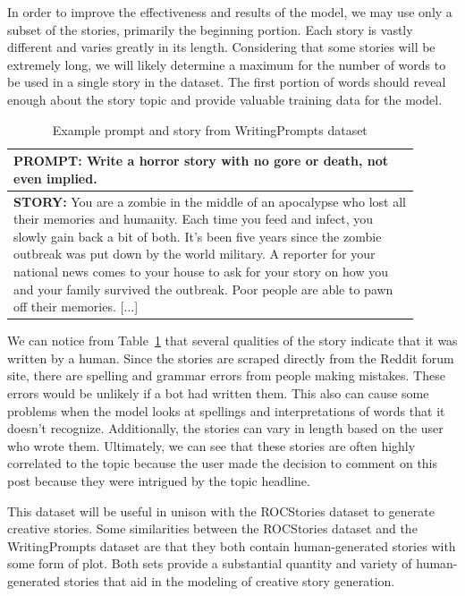 \documentclass{article} %
\begin{document}
In order to improve the effectiveness and results of the model, we may use only a subset of the stories, primarily the beginning portion. Each story is vastly different and varies greatly in its length. Considering that some stories will be extremely long, we will likely determine a maximum for the number of words to be used in a single story in the dataset. The first portion of words should reveal enough about the story topic and provide valuable training data for the model. 

\begin{table}[htbp]
\centering
\caption{Example prompt and story from WritingPrompts dataset}
\begin{tabular}{p{0.9\linewidth}}
\hline
\noindent \textbf{PROMPT:} Write a horror story with no gore or death, not even implied. \\
\hline
\noindent \textbf{STORY:} You are a zombie in the middle of an apocalypse who lost all their memories and humanity. Each time you feed and infect, you slowly gain back a bit of both. It's been five years since the zombie outbreak was put down by the world military. A reporter for your national news comes to your house to ask for your story on how you and your family survived the outbreak. Poor people are able to pawn off their memories. [$\dots$] \\
\hline
\end{tabular}
\label{table:example}
\end{table}

We can notice from Table~\ref{table:example} that several qualities of the story indicate that it was written by a human. Since the stories are scraped directly from the Reddit forum site, there are spelling and grammar errors from people making mistakes. These errors would be unlikely if a bot had written them. This also can cause some problems when the model looks at spellings and interpretations of words that it doesn't recognize. Additionally, the stories can vary in length based on the user who wrote them. Ultimately, we can see that these stories are often highly correlated to the topic because the user made the decision to comment on this post because they were intrigued by the topic headline.

This dataset will be useful in unison with the ROCStories dataset to generate creative stories. Some similarities between the ROCStories dataset and the WritingPrompts dataset are that they both contain human-generated stories with some form of plot. Both sets provide a substantial quantity and variety of human-generated stories that aid in the modeling of creative story generation. 
\end{document}
